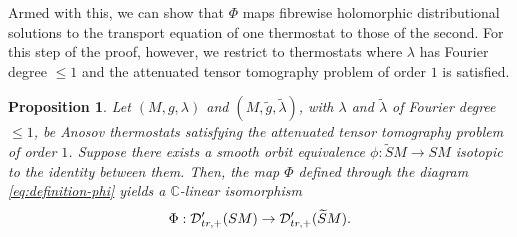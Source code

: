 \documentclass[reqno,12pt,letterpaper]{amsart}
\newtheorem{proposition}{Proposition}[section]
\theoremstyle{definition}
\theoremstyle{remark}
\theoremstyle{definition}
\numberwithin{equation}{section}
\begin{document}
Armed with this, we can show that $\Phi$ maps fibrewise holomorphic distributional solutions to the transport equation of one thermostat to those of the second. For this step of the proof, however, we restrict to thermostats where $\lambda$ has Fourier degree $\leq 1$ and the attenuated tensor tomography problem of order $1$ is satisfied. 

\begin{proposition}\label{proposition:action-1}
Let $(M, g, \lambda)$ and $(M, \tilde{g}, \tilde{\lambda})$, with $\lambda$ and $\tilde{\lambda}$ of Fourier degree $\leq 1$, be Anosov thermostats satisfying the attenuated tensor tomography problem of order $1$. Suppose there exists a smooth orbit equivalence $\phi : \widetilde{S}M\to SM$ isotopic to the identity between them. Then, the map $\Phi$ defined through the diagram \eqref{eq:definition-phi} yields a $\mathbb{C}$-linear isomorphism
$$\Phi:\mathcal{D}'_{\textup{tr},+}(SM)\to 	\mathcal{D}'_{\textup{tr},+}(\widetilde{S}M).$$
\end{proposition}
\end{document}
